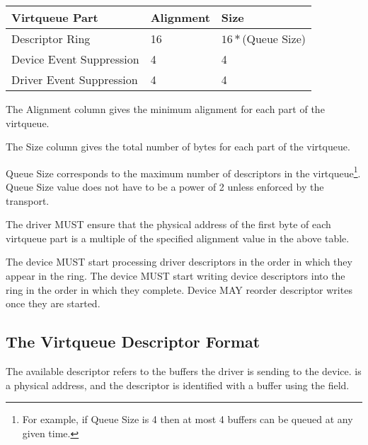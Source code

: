 \begin{tabular}{|l|l|l|}
\hline
Virtqueue Part    & Alignment & Size \\
\hline \hline
Descriptor Ring  & 16        & $16 * $(Queue Size) \\
\hline
Device Event Suppression    & 4         & 4 \\
 \hline
Driver Event Suppression         & 4         & 4 \\
 \hline
\end{tabular}

The Alignment column gives the minimum alignment for each part
of the virtqueue.

The Size column gives the total number of bytes for each
part of the virtqueue.

Queue Size corresponds to the maximum number of descriptors in the
virtqueue\footnote{For example, if Queue Size is 4 then at most 4 buffers
can be queued at any given time.}.  Queue Size value does not
have to be a power of 2 unless enforced by the transport.

The driver MUST ensure that the physical address of the first byte
of each virtqueue part is a multiple of the specified alignment value
in the above table.

The device MUST start processing driver descriptors in the order
in which they appear in the ring.
The device MUST start writing device descriptors into the ring in
the order in which they complete.
Device MAY reorder descriptor writes once they are started.

\subsection{The Virtqueue Descriptor Format}\label{sec:Basic
Facilities of a Virtio Device / Packed Virtqueues / The Virtqueue
Descriptor Format}

The available descriptor refers to the buffers the driver is sending
to the device.  is a physical address, and the
descriptor is identified with a buffer using the  field.

